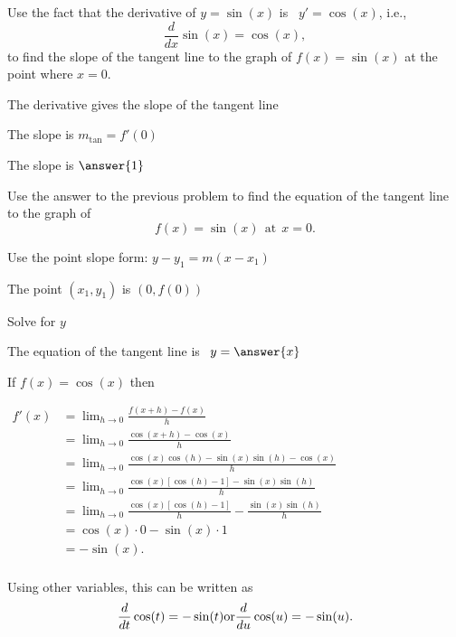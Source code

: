 \documentclass{ximera}
\begin{document}
\begin{problem} %
Use the fact that the derivative of $y = \sin(x)$ is \ $y' = \cos(x)$,
i.e., 
\[
\frac{d}{dx}\sin(x) = \cos(x),
\]
to find the slope of the tangent line to the graph of 
$f(x) = \sin(x)$ at the point where $x = 0$.\\
\begin{hint}
The derivative gives the slope of the tangent line
\end{hint}
\begin{hint}
The slope is $m_{\text{tan}} = f'(0)$
\end{hint}
The slope is $\answer{1}$
\end{problem}

\begin{problem} %
Use the answer to the previous problem to find the equation of the tangent line to the graph of 
\[
f(x) = \sin(x) \ \ \text{at} \ \ x=0.
\]
\begin{hint}
Use the point slope form: $y-y_1 = m(x-x_1)$
\end{hint}
\begin{hint}
The point $(x_1,y_1)$ is $(0, f(0))$
\end{hint}
\begin{hint}
Solve for $y$
\end{hint}
The equation of the tangent line is \ $y = \answer{x}$
\end{problem}





\begin{example}[example 9]
If $f(x) = \cos(x)$ then\\
\begin{center}
$\begin{aligned}
f'(x) &= \lim_{h \to 0} \frac{f(x+h)-f(x)}{h} \\[5pt]
&= \lim_{h \to 0} \frac{\cos(x+h) - \cos(x)}{h}\\[5pt]
&=  \lim_{h \to 0} \frac{\cos(x)\cos(h) - \sin(x)\sin(h) - \cos(x)}{h}\\[5pt]
&=  \lim_{h \to 0} \frac{\cos(x)[\cos(h) -1] - \sin(x)\sin(h)}{h}\\[5pt]
&=  \lim_{h \to 0} \frac{\cos(x)[\cos(h) -1]}{h} - \frac{\sin(x)\sin(h)}{h}\\[5pt]
&=   \cos(x) \cdot 0 - \sin(x)\cdot 1\\[5pt]
&= -\sin(x).\\[5pt]
\end{aligned}$
\end{center}
Using other variables, this can be written as
\[
\frac{d}{dt} \cos(t) = -\sin(t) \\
\text{or}\\
\frac{d}{du} \cos(u) = -\sin(u).
\]

\end{example}
\end{document}
